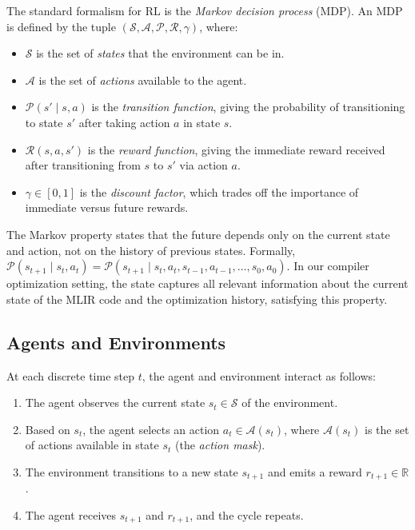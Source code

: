 The standard formalism for RL is the \textit{Markov decision process} (MDP). An MDP is defined by the tuple $(\mathcal{S}, \mathcal{A}, \mathcal{P}, \mathcal{R}, \gamma)$, where:

\begin{itemize}
    \item $\mathcal{S}$ is the set of \textit{states} that the environment can be in.
    \item $\mathcal{A}$ is the set of \textit{actions} available to the agent.
    \item $\mathcal{P}(s' \mid s, a)$ is the \textit{transition function}, giving the probability of transitioning to state $s'$ after taking action $a$ in state $s$.
    \item $\mathcal{R}(s, a, s')$ is the \textit{reward function}, giving the immediate reward received after transitioning from $s$ to $s'$ via action $a$.
    \item $\gamma \in [0, 1]$ is the \textit{discount factor}, which trades off the importance of immediate versus future rewards.
\end{itemize}

The Markov property states that the future depends only on the current state and action, not on the history of previous states. Formally, $\mathcal{P}(s_{t+1} \mid s_t, a_t) = \mathcal{P}(s_{t+1} \mid s_t, a_t, s_{t-1}, a_{t-1}, \ldots, s_0, a_0)$. In our compiler optimization setting, the state captures all relevant information about the current state of the MLIR code and the optimization history, satisfying this property.

\subsection{Agents and Environments}

At each discrete time step $t$, the agent and environment interact as follows:

\begin{enumerate}
    \item The agent observes the current state $s_t \in \mathcal{S}$ of the environment.
    \item Based on $s_t$, the agent selects an action $a_t \in \mathcal{A}(s_t)$, where $\mathcal{A}(s_t)$ is the set of actions available in state $s_t$ (the \textit{action mask}).
    \item The environment transitions to a new state $s_{t+1}$ and emits a reward $r_{t+1} \in \mathbb{R}$.
    \item The agent receives $s_{t+1}$ and $r_{t+1}$, and the cycle repeats.
\end{enumerate}

